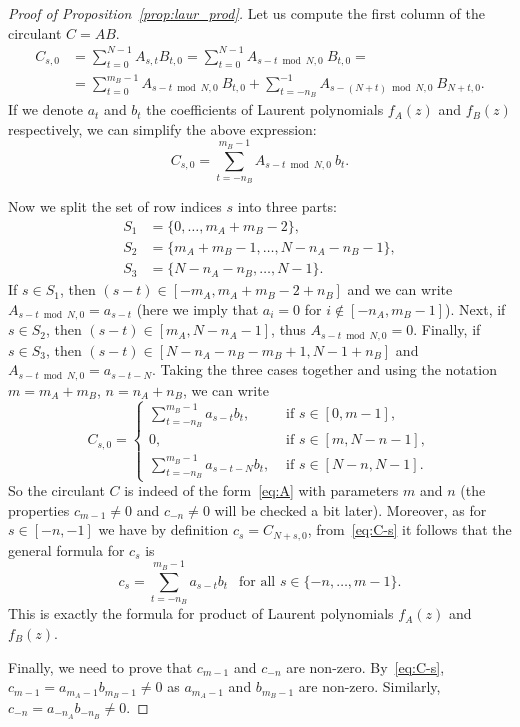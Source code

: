 \documentclass[a4paper]{article}
\begin{document}
	\begin{proof}[Proof of Proposition~\ref{prop:laur_prod}]
	Let us compute the first column of the circulant $C = AB$.
	\begin{align*}
	    C_{s,0}
	    &=
	    \sum_{t=0}^{N-1} A_{s,t}B_{t,0}
	    =
	    \sum_{t=0}^{N-1} A_{s-t \bmod N,0}~B_{t,0}
	    = \\ &=
	    \sum_{t=0}^{m_B-1} A_{s-t \bmod N,0}~B_{t,0}
	    +
	    \sum_{t=-n_B}^{-1} A_{s-(N+t) \bmod N,0}~B_{N+t,0}.
	\end{align*}
	If we denote $a_t$ and $b_t$ the coefficients of Laurent polynomials $f_A(z)$ and $f_B(z)$ respectively, we can simplify the above expression:
	\[
	C_{s, 0} = \sum_{t=-n_B}^{m_B-1} A_{s-t \bmod N,0}~b_t.
	\]
	
	Now we split the set of row indices $s$ into three parts:
	\begin{align*}
	S_1 &= \{0, \dots, m_A+m_B-2\},\\
	S_2 &= \{m_A+m_B-1, \dots, N-n_A-n_B-1\}, \\
	S_3 &=\{N-n_A-n_B,\dots,N-1\}.    
	\end{align*}
%	
	If $s \in S_1$, then $(s-t) \in [-m_A, m_A+m_B-2+n_B]$ and we can write $A_{s-t \bmod N, 0} = a_{s-t}$ (here we imply that $a_i = 0$ for $i \not\in [-n_A, m_B-1]$).
	Next, if $s \in S_2$, then $(s-t) \in [m_A, N-n_A-1]$, thus $A_{s-t \bmod N,0} = 0$.
	Finally, if $s \in S_3$, then $(s-t) \in [N-n_A-n_B-m_B+1, N-1+n_B]$ and $A_{s-t \bmod N, 0} = a_{s-t-N}$.
	Taking the three cases together and using the notation $m = m_A + m_B$, $n=n_A + n_B$, we can write
	\begin{equation}\label{eq:C-s}
	C_{s,0} = \begin{cases}
	    \sum_{t=-n_B}^{m_B-1} a_{s-t}b_t,
	    &\text{ if } s \in [0, m-1],\\
	    0, &\text{ if } s \in [m, N-n-1], \\
	    \sum_{t=-n_B}^{m_B-1} a_{s-t-N}b_t, & \text{ if } s \in [N-n, N-1].
	\end{cases}
	\end{equation}
	So the circulant $C$ is indeed of the form~\eqref{eq:A} with parameters $m$ and $n$ (the properties $c_{m-1} \neq 0$ and $c_{-n} \neq 0$ will be checked a bit later).
	Moreover, as for $s \in [-n,-1]$ we have by definition
	$c_s = C_{N+s, 0}$, from~\eqref{eq:C-s} it follows that the general formula for $c_s$ is
	\[
	c_s = \sum_{t=-n_B}^{m_B-1} a_{s-t}b_t~~\text{ for all } s \in \{-n, \dots, m-1\}.
	\]
	This is exactly the formula for product of Laurent polynomials $f_A(z)$ and $f_B(z)$.
	
	Finally, we need to prove that $c_{m-1}$ and $c_{-n}$ are non-zero.
	By~\eqref{eq:C-s}, $c_{m-1} = a_{m_A-1}b_{m_B-1} \neq 0$ as $a_{m_A-1}$ and $b_{m_B-1}$ are non-zero.
	Similarly, $c_{-n} = a_{-n_A}b_{-n_B} \neq 0$.
	\end{proof}
\end{document}

